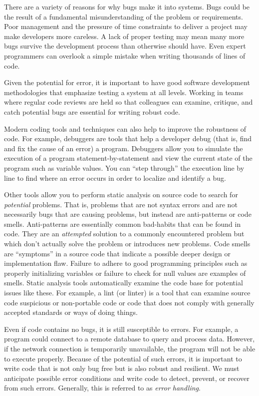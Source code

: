 There are a variety of reasons for why bugs make it into systems.
Bugs could be the result of a fundamental misunderstanding of
the problem or requirements.  Poor management and
the pressure of time constraints to deliver a project may make
developers more careless.  A lack of proper testing may mean
many more bugs survive the development process than otherwise
should have.  Even expert programmers can overlook a simple
mistake when writing thousands of lines of code.  

Given the potential for error, it is important to have good software development
methodologies that emphasize testing a system at all levels.
Working in teams where regular code reviews are held so that
colleagues can examine, critique, and catch potential bugs
are essential for writing robust code.

Modern coding tools and techniques can also help to improve
the robustness of code.  For example, 
\glspl{debugger} are 
tools that help a developer \gls{debug} (that is, find and fix
the cause of an error) a program.  Debuggers 
allow you to simulate the execution of a program statement-by-statement 
and view the current state of the program such
as variable values.  You can ``step through'' the execution
line by line to find where an error occurs in order to localize
and identify a bug.

Other tools allow you to perform \gls{static analysis} on 
source code to search for \emph{potential} problems.  
That is, problems that are not syntax errors and are not 
necessarily bugs that are causing problems, but instead 
are \glspl{anti-pattern} or \glspl{code smell}.  Anti-patterns
are essentially common bad-habits that can be found in
code.  They are an \emph{attempted} solution to a commonly
encountered problem but which don't actually solve the
problem or introduces new problems.  Code smells are 
``symptoms'' in a source code that indicate a possible
deeper design or implementation flaw.  Failure to adhere
to good programming principles such as properly initializing
variables or failure to check for null values are examples of
smells.  Static analysis tools automatically examine the
code base for potential issues like these.  For example, a
 \gls{lint} (or linter) is a tool that can examine source code 
suspicious or non-portable code or code that does not
comply with generally accepted standards or ways of 
doing things.

Even if code contains no bugs, it is still susceptible to
errors.  For example, a program could connect to a 
remote database to \gls{query} and process data.  However, if
the network connection is temporarily unavailable, the
program will not be able to execute properly.  Because
of the potential of such errors, it is important to write
code that is not only bug free but is also robust and resilient.  We must anticipate possible 
error conditions and write code to detect, prevent, or 
recover from such errors.  Generally, this is referred to 
as \emph{error handling}.

